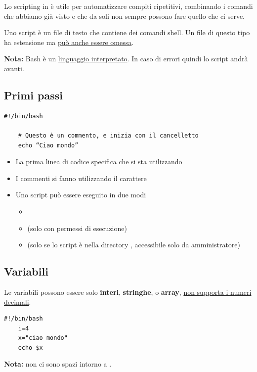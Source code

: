 \documentclass[../main.tex]{subfiles}
\begin{document}
Lo scripting in  è utile per automatizzare compiti ripetitivi, combinando i comandi che abbiamo già visto e che da soli non 
sempre possono fare quello che ci serve.

Uno script è un file di testo che contiene dei comandi shell. Un file di questo tipo ha estensione  ma \underline{può anche
essere omessa}.

\textbf{Nota:} Bash è un \underline{linguaggio interpretato}. In caso di errori quindi lo script andrà avanti.

\vspace{0.5cm}
\subsection{Primi passi}
\begin{lstlisting}[style=bash]
    #!/bin/bash

    # Questo è un commento, e inizia con il cancelletto
    echo “Ciao mondo”
\end{lstlisting}
\begin{itemize}
    \item La prima linea di codice specifica che si sta utilizzando 
    \item I commenti si fanno utilizzando il carattere \code{\#}
    \item Uno script può essere eseguito in due modi 
    \begin{itemize}
        \item {}
        \item {} (solo con permessi di esecuzione)
        \item {} (solo se lo script è nella directory , accessibile solo da amministratore)
    \end{itemize}
\end{itemize}

\vspace{0.5cm}
\subsection{Variabili}
Le variabili possono essere solo \textbf{interi}, \textbf{stringhe}, o \textbf{array},  \underline{non supporta i numeri decimali}.
\begin{lstlisting}[style=bash]
    #!/bin/bash
    i=4
    x="ciao mondo"
    echo $x
\end{lstlisting}
\textbf{Nota:} non ci sono spazi intorno a \code{=}.
\end{document}
